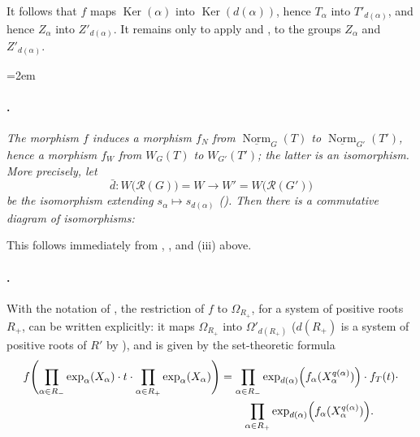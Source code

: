 It follows that \(f\) maps \(\operatorname{Ker}(\alpha)\) into
\(\operatorname{Ker}(d(\alpha))\), hence \(T_\alpha\) into
\(T'_{d(\alpha)}\), and hence \(Z_\alpha\) into
\(Z'_{d(\alpha)}\). It remains only to apply  and
, to the groups \(Z_\alpha\) and \(Z'_{d(\alpha)}\).

\begingroup
\emergencystretch=2em
\paragraph{.}
\textit{The morphism \(f\) induces a morphism \(f_N\) from
\(\underline{\operatorname{Norm}}_G(T)\) to
\(\underline{\operatorname{Norm}}_{G'}(T')\), hence a morphism
\(f_W\) from \(W_G(T)\) to \(W_{G'}(T')\); the latter is an
isomorphism. More precisely, let}
\[
  \bar d:W\bigl(\mathscr R(G)\bigr)=W
  \longrightarrow
  W'=W\bigl(\mathscr R(G')\bigr)
\]
\textit{be the isomorphism extending
\(s_\alpha\mapsto s_{d(\alpha)}\) \textup{()}.
Then there is a commutative diagram of isomorphisms:}
\endgroup

\begin{center}
  
\end{center}

This follows immediately from , , and
\textup{(iii)} above.

\paragraph{.}
With the notation of , the restriction of \(f\) to
\(\Omega_{R_+}\), for a system of positive roots \(R_+\), can be
written explicitly: it maps \(\Omega_{R_+}\) into
\(\Omega'_{d(R_+)}\) \textup{(\(d(R_+)\) is a system of positive
roots of \(R'\) by )}, and is given by the
set-theoretic formula
\[
\begin{aligned}
  f\Biggl(
    \prod_{\alpha\in R_-}\exp_\alpha(X_\alpha)
    \mathbin{\cdot}t\mathbin{\cdot}
    \prod_{\alpha\in R_+}\exp_\alpha(X_\alpha)
  \Biggr)
  &=
  \prod_{\alpha\in R_-}
    \exp_{d(\alpha)}
    \Bigl(f_\alpha(X_\alpha^{q(\alpha)})\Bigr)
  \mathbin{\cdot}f_T(t)\mathbin{\cdot}\\
  &\qquad
  \prod_{\alpha\in R_+}
    \exp_{d(\alpha)}
    \Bigl(f_\alpha(X_\alpha^{q(\alpha)})\Bigr).
\end{aligned}
\]

